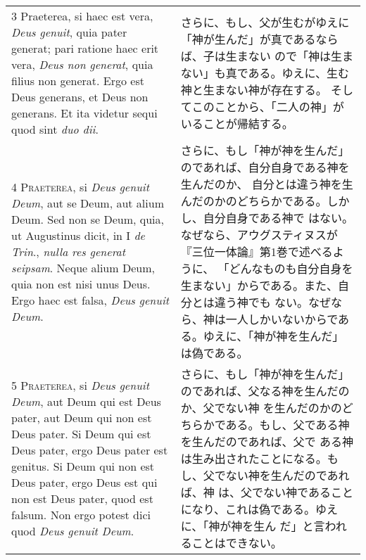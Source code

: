 \documentclass[10pt]{jsarticle} %
\begin{document}
\begin{longtable}{p{21em}p{21em}}
\\



3 Praeterea, si haec est vera, {\itshape Deus genuit}, quia pater generat; pari
ratione haec erit vera, {\itshape Deus non generat}, quia filius non generat. Ergo
est Deus generans, et Deus non generans. Et ita videtur sequi quod sint
{\itshape duo dii}.

&

さらに、もし、父が生むがゆえに「神が生んだ」が真であるならば、子は生まない
 ので「神は生まない」も真である。ゆえに、生む神と生まない神が存在する。
 そしてこのことから、「二人の神」がいることが帰結する。
 
\\



4 {\scshape Praeterea}, si {\itshape Deus genuit Deum}, aut se Deum, aut alium Deum. Sed non se
Deum, quia, ut Augustinus dicit, in I {\itshape de Trin}., {\itshape nulla res generat
seipsam}. Neque alium Deum, quia non est nisi unus Deus. Ergo haec est
falsa, {\itshape Deus genuit Deum}.

&

さらに、もし「神が神を生んだ」のであれば、自分自身である神を生んだのか、
 自分とは違う神を生んだのかのどちらかである。しかし、自分自身である神で
 はない。なぜなら、アウグスティヌスが『三位一体論』第1巻で述べるように、
 「どんなものも自分自身を生まない」からである。また、自分とは違う神でも
 ない。なぜなら、神は一人しかいないからである。ゆえに、「神が神を生んだ」
 は偽である。


\\



5 {\scshape Praeterea}, si {\itshape Deus genuit Deum}, aut Deum qui est Deus pater, aut Deum
qui non est Deus pater. Si Deum qui est Deus pater, ergo Deus pater est
genitus. Si Deum qui non est Deus pater, ergo Deus est qui non est Deus
pater, quod est falsum. Non ergo potest dici quod {\itshape Deus genuit Deum}.

&

さらに、もし「神が神を生んだ」のであれば、父なる神を生んだのか、父でない神
 を生んだのかのどちらかである。もし、父である神を生んだのであれば、父で
 ある神は生み出されたことになる。もし、父でない神を生んだのであれば、神
 は、父でない神であることになり、これは偽である。ゆえに、「神が神を生ん
 だ」と言われることはできない。


\\




\end{longtable}
\end{document}
